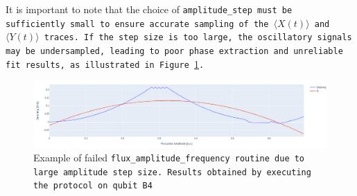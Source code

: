 It is important to note that the choice of \tt{amplitude\_step} must be sufficiently small to ensure accurate sampling of the $\langle X(t) \rangle$ and $\langle Y(t) \rangle$ traces. 
If the step size is too large, the oscillatory signals may be undersampled, leading to poor phase extraction and unreliable fit results, as illustrated in Figure \ref{fig:bad_sampling}.

\begin{figure}[h!]
    \centering
    \includegraphics[width=\textwidth]{figures/png/low_sampling.png}
    \caption{Example of failed \tt{flux\_amplitude\_frequency} routine due to large amplitude step size. Results obtained by executing the protocol on qubit \tt{B4}}
    \label{fig:bad_sampling}
\end{figure}